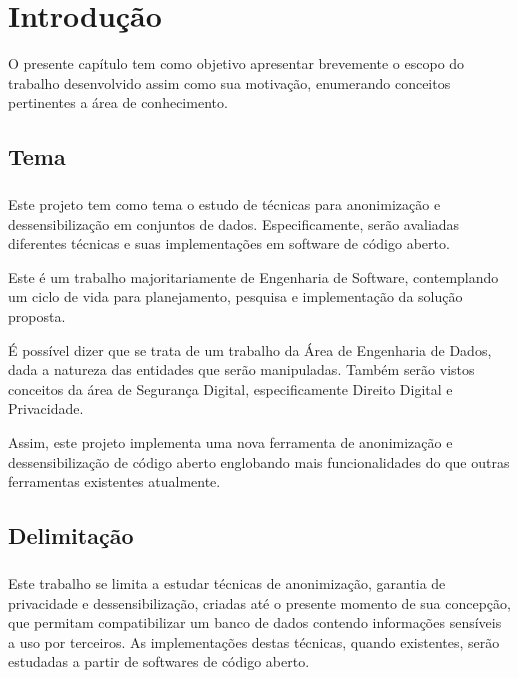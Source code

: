 \chapter{Introdução}
\label{cap1}

O presente capítulo tem como objetivo apresentar brevemente o escopo do trabalho desenvolvido assim como sua motivação, enumerando conceitos pertinentes a área de conhecimento.

\section{Tema}

\paragraph{} Este projeto tem como tema o estudo de técnicas para anonimização e dessensibilização em conjuntos de dados. Especificamente, serão avaliadas diferentes técnicas e suas implementações em software de código aberto. 

Este é um trabalho majoritariamente de Engenharia de Software, contemplando um ciclo de vida para planejamento, pesquisa e implementação da solução proposta.

É possível dizer que se trata de um trabalho da Área de Engenharia de Dados, dada a natureza das entidades que serão manipuladas. Também serão vistos conceitos da área de Segurança Digital, especificamente Direito Digital e Privacidade.

Assim, este projeto implementa uma nova ferramenta de anonimização e dessensibilização de código aberto englobando mais funcionalidades do que outras ferramentas existentes atualmente.


\section{Delimitação}

\paragraph{} Este trabalho se limita a estudar técnicas de anonimização, garantia de privacidade e dessensibilização, criadas até o presente momento de sua concepção, que permitam compatibilizar um banco de dados contendo informações sensíveis a uso por terceiros. As implementações destas técnicas, quando existentes, serão estudadas a partir de softwares de código aberto.

